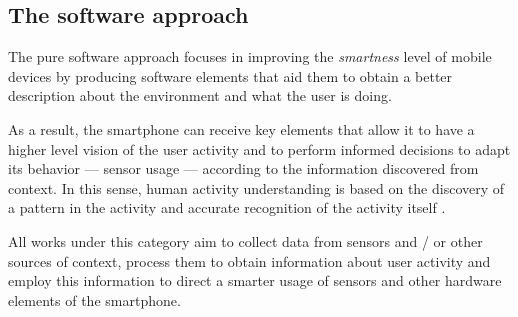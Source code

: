 \subsection{The software approach} 
\label{sub:the_software_approach}

The pure software approach focuses in improving the \emph{smartness} level of mobile devices by producing software elements that aid them to obtain a better description about the environment and what the user is doing.

As a result, the smartphone can receive key elements that allow it to have a higher level vision of the user activity and to perform informed decisions to adapt its behavior --- sensor usage --- according to the information discovered from context.
In this sense, human activity understanding is based on the discovery of a pattern in the activity and accurate recognition of the activity itself \cite{Yurur2014a}.

All works under this category aim to collect data from sensors and / or other sources of context, process them to obtain information about user activity and employ this information to direct a smarter usage of sensors and other hardware elements of the smartphone.


